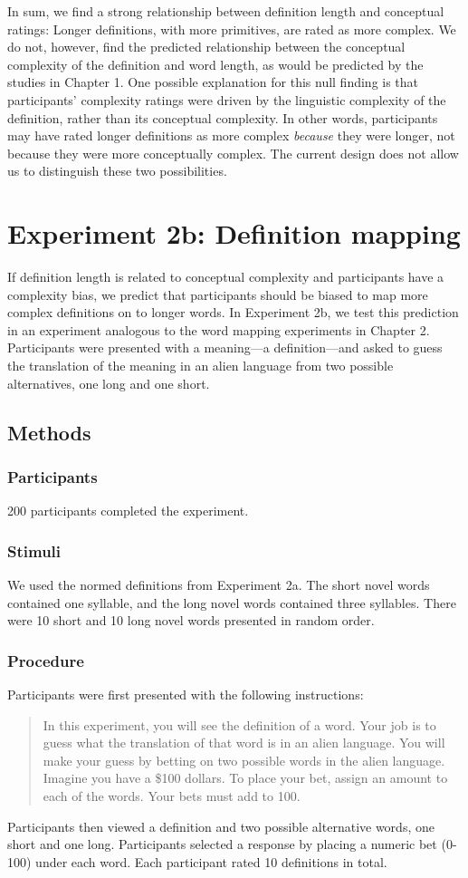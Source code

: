 In sum, we find a strong relationship between definition length and conceptual ratings: Longer definitions, with more primitives, are rated as more complex. We do not, however, find the predicted relationship between the conceptual complexity of the definition and word length, as would be predicted by the studies in Chapter 1.  One possible explanation for this null finding is that participants' complexity ratings were driven by the linguistic complexity of the definition, rather than its conceptual complexity. In other words, participants may have  rated longer definitions as more complex {\it because} they were longer, not because they were more conceptually complex. The current design does not allow us to distinguish these two possibilities.

\section{Experiment 2b: Definition mapping}
If definition length is related to conceptual complexity and participants have a complexity bias, we predict that participants should be biased to map more complex definitions on to longer words. In Experiment 2b, we test this prediction in an experiment analogous to the word mapping experiments in Chapter 2. Participants were presented with a meaning---a definition---and asked to guess the translation of the meaning in an alien language from two possible alternatives, one long and one short. 

\subsection{Methods}
\subsubsection{Participants}
200 participants completed the experiment.
\subsubsection{Stimuli}
We used the normed definitions from Experiment 2a. The short novel words contained one syllable, and the long novel words contained three syllables. There were 10 short and 10 long novel words presented in random order. \\
\subsubsection{Procedure}
Participants were first presented with the following instructions:
\begin{quote}
In this experiment, you will see the definition of a word. Your job is to guess what the translation of that word is in an alien language. You will make your guess by betting on two possible words in the alien language. Imagine you have a \$100 dollars. To place your bet, assign an amount to each of the words. Your bets must add to 100.
\end{quote}
Participants then viewed a definition and two possible alternative words, one short and one long. Participants selected a response by placing a numeric bet (0-100) under each word.  Each participant rated 10 definitions in total. 

